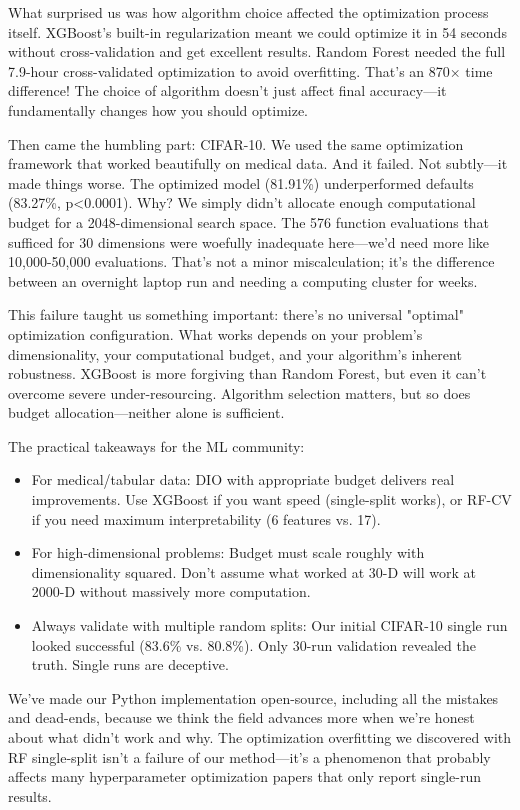 \documentclass[12pt, a4paper]{article}
\begin{document}
What surprised us was how algorithm choice affected the optimization process itself. XGBoost's built-in regularization meant we could optimize it in 54 seconds without cross-validation and get excellent results. Random Forest needed the full 7.9-hour cross-validated optimization to avoid overfitting. That's an 870× time difference! The choice of algorithm doesn't just affect final accuracy—it fundamentally changes how you should optimize.

Then came the humbling part: CIFAR-10. We used the same optimization framework that worked beautifully on medical data. And it failed. Not subtly—it made things worse. The optimized model (81.91\%) underperformed defaults (83.27\%, p<0.0001). Why? We simply didn't allocate enough computational budget for a 2048-dimensional search space. The 576 function evaluations that sufficed for 30 dimensions were woefully inadequate here—we'd need more like 10,000-50,000 evaluations. That's not a minor miscalculation; it's the difference between an overnight laptop run and needing a computing cluster for weeks.

This failure taught us something important: there's no universal "optimal" optimization configuration. What works depends on your problem's dimensionality, your computational budget, and your algorithm's inherent robustness. XGBoost is more forgiving than Random Forest, but even it can't overcome severe under-resourcing. Algorithm selection matters, but so does budget allocation—neither alone is sufficient.

The practical takeaways for the ML community:
\begin{itemize}
    \item For medical/tabular data: DIO with appropriate budget delivers real improvements. Use XGBoost if you want speed (single-split works), or RF-CV if you need maximum interpretability (6 features vs. 17).
    \item For high-dimensional problems: Budget must scale roughly with dimensionality squared. Don't assume what worked at 30-D will work at 2000-D without massively more computation.
    \item Always validate with multiple random splits: Our initial CIFAR-10 single run looked successful (83.6\% vs. 80.8\%). Only 30-run validation revealed the truth. Single runs are deceptive.
\end{itemize}

We've made our Python implementation open-source, including all the mistakes and dead-ends, because we think the field advances more when we're honest about what didn't work and why. The optimization overfitting we discovered with RF single-split isn't a failure of our method—it's a phenomenon that probably affects many hyperparameter optimization papers that only report single-run results.
\end{document}
